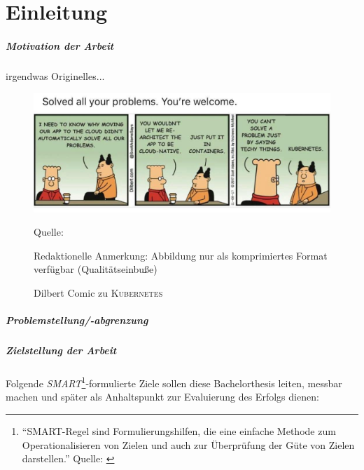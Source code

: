 \acresetall 
{} %
\chapter{Einleitung}
\paragraph{Motivation der Arbeit}
irgendwas Originelles...
\begin{figure}[H]
	\centering
	\includegraphics[scale=0.33]{img/dilbertCloud.jpeg}
	\caption{Dilbert Comic zu \textsc{Kubernetes}}
	{\footnotesize Quelle: \cite{DilbertKubernetes}\par}
	{\footnotesize Redaktionelle Anmerkung: Abbildung nur als komprimiertes Format verfügbar (Qualitätseinbuße)}
\end{figure}

\paragraph{Problemstellung/-abgrenzung}

\paragraph{Zielstellung der Arbeit}
Folgende \textit{SMART}\footnote{\enquote{SMART-Regel sind Formulierungshilfen, die eine einfache Methode zum Operationalisieren von Zielen und auch zur Überprüfung der Güte von Zielen darstellen.} Quelle: \cite[][S.69]{dechange_projektmanagement_2020}}-formulierte Ziele sollen diese Bachelorthesis leiten, messbar machen und später als Anhaltspunkt zur Evaluierung des Erfolgs dienen:


